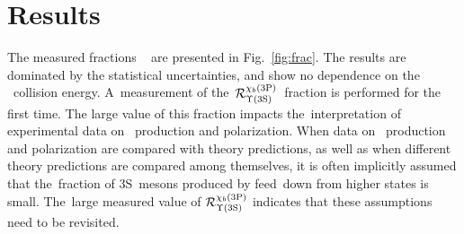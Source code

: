 \section{Results}
\label{sec:Conclusion}


The measured fractions \Rmn~\cite{Aaij:1746553} are presented in Fig.~\ref{fig:frac}.
The results are dominated by the statistical uncertainties, and show no dependence on the \proton\proton~collision energy.
A~measurement of the~$\mathcal{R}^{\chibthreep}_{\Y3S}$~fraction is performed for the first time.
The large value of this fraction impacts the~interpretation
of experimental data on \ups~production and polarization.
When data on \ups~production and polarization are compared with theory predictions,
as well as when different theory predictions are compared among themselves, it is often implicitly assumed
that the~fraction of \Y3S~mesons produced by feed~down from higher states is small.
The~large measured value of  $\mathcal{R}^{\chibthreep}_{\Y3S}$
indicates that these assumptions need to be revisited. 


